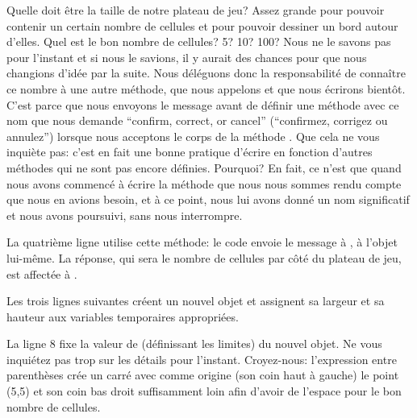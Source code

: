 \documentclass[a4paper,10pt,twoside]{book}
\begin{document}
Quelle doit être la taille de notre plateau de jeu? Assez grande pour pouvoir contenir un certain nombre de cellules et pour pouvoir dessiner un bord autour d'elles.
Quel est le bon nombre de cellules? 5? 10? 100? Nous ne le savons pas
pour l'instant et si nous le savions, il y aurait des chances pour que
nous changions d'idée par la suite. Nous déléguons donc la
responsabilité de connaître ce nombre à une autre méthode, que nous
appelons  et que nous écrirons bientôt.
C'est parce que nous envoyons le message  avant de
définir une méthode avec ce nom que \pharo nous demande ``confirm,
correct, or cancel'' (\cad ``confirmez, corrigez ou annulez'') lorsque
nous acceptons le corps de la méthode \mbox{.}
Que cela ne vous inquiète pas:
c'est en fait une bonne pratique d'écrire en fonction d'autres méthodes qui ne sont pas encore définies.
Pourquoi? En fait, ce n'est que quand nous avons commencé à écrire la
méthode  que nous nous sommes rendu compte que nous en
avions besoin, et à ce point, nous lui avons donné un nom 
significatif et nous avons poursuivi, sans nous interrompre.
 
La quatrième ligne utilise cette méthode: le code \st {} envoie le message  à , \cad à l'objet lui-même. La réponse, qui sera le nombre de cellules par côté du plateau de jeu, est affectée à .

Les trois lignes suivantes créent un nouvel objet  et assignent sa largeur et sa hauteur aux variables temporaires appropriées.

La ligne 8 fixe la valeur de  (définissant les limites) du nouvel objet. Ne vous inquiétez pas trop sur les détails pour l'instant. Croyez-nous: l'expression entre parenthèses crée un carré avec comme origine (\ie son coin haut à gauche) le point (5,5) et son coin bas droit suffisamment loin afin d'avoir de l'espace pour le bon nombre de cellules.
\end{document}
